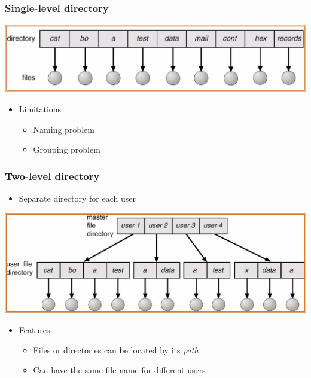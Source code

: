 \documentclass[CJKutf8,xcolor=pdftex,dvipsnames,table]{beamer}
\begin{document}
\begin{CJK*}{UTF8}{song}
  \begin{frame}
    \frametitle{Single-level directory} \pause
    \begin{center}
      \includegraphics[scale=.5]{v6f11-6} \pause
    \end{center}
    \begin{itemize}
    \item Limitations \pause
      \begin{itemize}
      \item Naming problem \pause
      \item Grouping problem
      \end{itemize}
    \end{itemize}
  \end{frame}

  \begin{frame}
    \frametitle{Two-level directory} \pause
    \begin{itemize}
    \item Separate directory for each user \pause
    \end{itemize}
    \begin{center}
      \includegraphics[scale=.5]{v6f11-7} \pause
    \end{center}
    \begin{itemize}
    \item Features \pause
      \begin{itemize}
      \item Files or directories can be located by its \emph{path} \pause
      \item Can have the same file name for different users
      \end{itemize}
    \end{itemize}
  \end{frame}


\end{CJK*}
\end{document}
